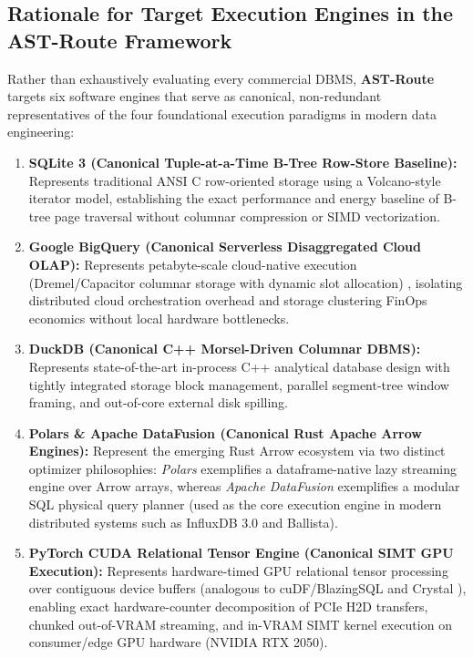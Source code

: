 \documentclass[10pt,a4paper]{article}
\begin{document}
\subsection{Rationale for Target Execution Engines in the AST-Route Framework}
Rather than exhaustively evaluating every commercial DBMS, \textbf{AST-Route} targets six software engines that serve as canonical, non-redundant representatives of the four foundational execution paradigms in modern data engineering:
\begin{enumerate}[leftmargin=1.5em,itemsep=2pt]
    \item \textbf{SQLite 3 (Canonical Tuple-at-a-Time B-Tree Row-Store Baseline):} Represents traditional ANSI C row-oriented storage using a Volcano-style iterator model, establishing the exact performance and energy baseline of B-tree page traversal without columnar compression or SIMD vectorization.
    \item \textbf{Google BigQuery (Canonical Serverless Disaggregated Cloud OLAP):} Represents petabyte-scale cloud-native execution (Dremel/Capacitor columnar storage with dynamic slot allocation) \cite{melnik2020dremel}, isolating distributed cloud orchestration overhead and storage clustering FinOps economics without local hardware bottlenecks.
    \item \textbf{DuckDB (Canonical C++ Morsel-Driven Columnar DBMS):} Represents state-of-the-art in-process C++ analytical database design \cite{raasveldt2019duckdb, kuiper2024duckdb_ooc} with tightly integrated storage block management, parallel segment-tree window framing, and out-of-core external disk spilling.
    \item \textbf{Polars \& Apache DataFusion (Canonical Rust Apache Arrow Engines):} Represent the emerging Rust Arrow ecosystem via two distinct optimizer philosophies: \emph{Polars} exemplifies a dataframe-native lazy streaming engine over Arrow arrays, whereas \emph{Apache DataFusion} \cite{lamb2024datafusion} exemplifies a modular SQL physical query planner (used as the core execution engine in modern distributed systems such as InfluxDB 3.0 and Ballista).
    \item \textbf{PyTorch CUDA Relational Tensor Engine (Canonical SIMT GPU Execution):} Represents hardware-timed GPU relational tensor processing over contiguous device buffers (analogous to cuDF/BlazingSQL \cite{kim2022blazingsql} and Crystal \cite{shanbhag2020crystal}), enabling exact hardware-counter decomposition of PCIe H2D transfers, chunked out-of-VRAM streaming, and in-VRAM SIMT kernel execution on consumer/edge GPU hardware (NVIDIA RTX 2050).
\end{enumerate}
\end{document}

